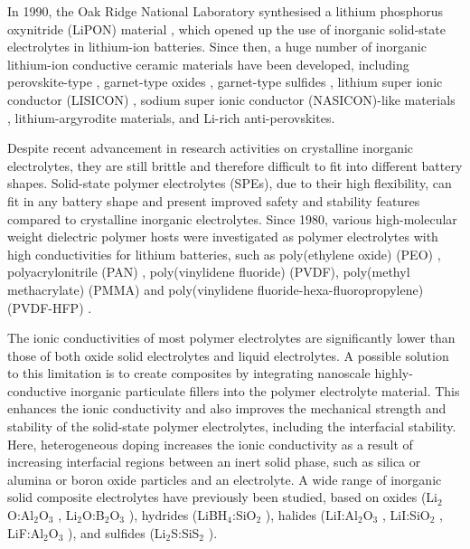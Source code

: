 \documentclass[../main.tex]{subfiles}
\begin{document}
In 1990, the Oak Ridge National Laboratory synthesised a lithium phosphorus oxynitride (LiPON) material \cite{dudney1992,bates1992}, which opened up the use of inorganic solid-state electrolytes in lithium-ion batteries. Since then, a huge number of inorganic lithium-ion conductive ceramic materials have been developed, including perovskite-type \cite{inaguma1993}, garnet-type oxides \cite{kasper1969,mazza1988}, garnet-type sulfides \cite{kennedy1986}, lithium super ionic conductor (LISICON) \cite{ivanov1988}, sodium super ionic conductor (NASICON)-like materials \cite{lang2015}, lithium-argyrodite materials, \cite{deklerk2016} and Li-rich anti-perovskites. \cite{dawson2018elucidating,ahiavi2020mechanochemical}

Despite recent advancement in research activities on crystalline inorganic electrolytes, they are still brittle and therefore difficult to fit into different battery shapes. Solid-state polymer electrolytes (SPEs), due to their high flexibility, can fit in any battery shape and present improved safety and stability features compared to crystalline inorganic electrolytes. \cite{DIRICAN201927} Since 1980, various high-molecular weight dielectric polymer hosts were investigated as polymer electrolytes with high conductivities for lithium batteries, such as poly(ethylene oxide) (PEO) \cite{fenton1973}, polyacrylonitrile (PAN) \cite{abraham1990,dautzenberg1994}, poly(vinylidene fluoride) (PVDF), \cite{arcella1999,kataoka2000,li2016} poly(methyl methacrylate) (PMMA) \cite{appetecchi1995,bohnke1993} and poly(vinylidene fluoride-hexa-fluoropropylene) (PVDF-HFP) \cite{abbrent2001,park2008,yang2014}.

The ionic conductivities of most polymer electrolytes are significantly lower than those of both oxide solid electrolytes and liquid electrolytes. \cite{zhou2016} A possible solution to this limitation is to create composites by integrating nanoscale highly-conductive inorganic particulate fillers into the polymer electrolyte material. \cite{DIRICAN201927} This enhances the ionic conductivity and also improves the mechanical strength and stability of the solid-state polymer electrolytes, including the interfacial stability. \cite{D0SC03121F} Here, heterogeneous doping increases the ionic conductivity as a result of increasing interfacial regions between an inert solid phase, such as silica or alumina or boron oxide particles and an electrolyte. \cite{uvarov2011} A wide range of inorganic solid composite electrolytes have previously been studied, based on oxides (Li$_{2}$O:Al$_{2}$O$_{3}$ \cite{B300908D}, Li$_{2}$O:B$_{2}$O$_{3}$ \cite{Heitjans_2003,Indris2000,Indris2002}), hydrides (LiBH$_{4}$:SiO$_{2}$ \cite{blanchard2015}), halides (LiI:Al$_{2}$O$_{3}$ \cite{liang1973}, LiI:SiO$_{2}$ \cite{phipps1983}, LiF:Al$_{2}$O$_{3}$ \cite{uvarov1992}), and sulfides (Li$_{2}$S:SiS$_{2}$ \cite{pradel1986}). 
\end{document}
